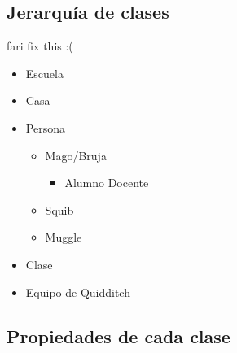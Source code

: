 \documentclass[11pt]{article}
\begin{document}
\subsection{Jerarquía de clases}

fari fix this :(

\begin{itemize}
    \item Escuela
    \item Casa
    \item Persona
          \begin{itemize}
              \item Mago/Bruja
                    \begin{itemize}
                      \item Alumno Docente 
                    \end{itemize}
              \item Squib
              \item Muggle
          \end{itemize}
    \item Clase
    \item Equipo de Quidditch
\end{itemize}

\subsection{Propiedades de cada clase}
\end{document}
